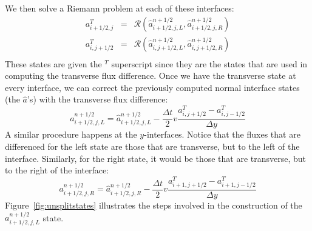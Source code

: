 \documentclass[11pt]{article}
\begin{document}
We then solve a Riemann problem at each of these interfaces:
\begin{eqnarray}
a^T_{i+1/2,j} &=& \mathcal{R}(\hat{a}_{i+1/2,j,L}^{n+1/2},
                              \hat{a}_{i+1/2,j,R}^{n+1/2}) \\
a^T_{i,j+1/2} &=& \mathcal{R}(\hat{a}_{i,j+1/2,L}^{n+1/2},
                              \hat{a}_{i,j+1/2,R}^{n+1/2}) \\
\end{eqnarray}
These states are given the $^T$ superscript since they are the states
that are used in computing the transverse flux difference.  Once we
have the transverse state at every interface, we can correct the 
previously computed normal interface states (the $\hat{a}$'s) with
the transverse flux difference:
\begin{equation}
a_{i+1/2,j,L}^{n+1/2} = \hat{a}_{i+1/2,j,L}^{n+1/2} 
   - \frac{\Delta t}{2} v \frac{a^T_{i,j+1/2} - a^T_{i,j-1/2}}{\Delta y}
\end{equation}
A similar procedure happens at the $y$-interfaces.  Notice that the
fluxes that are differenced for the left state are those that are
transverse, but to the left of the interface.  Similarly, for the
right state, it would be those that are transverse, but to the right
of the interface:
\begin{equation}
a_{i+1/2,j,R}^{n+1/2} = \hat{a}_{i+1/2,j,R}^{n+1/2} 
   - \frac{\Delta t}{2} v \frac{a^T_{i+1,j+1/2} - a^T_{i+1,j-1/2}}{\Delta y}
\end{equation}
Figure~\ref{fig:unsplitstates} illustrates the steps involved in
the construction of the $a_{i+1/2,j,L}^{n+1/2}$ state.
%
\end{document}
